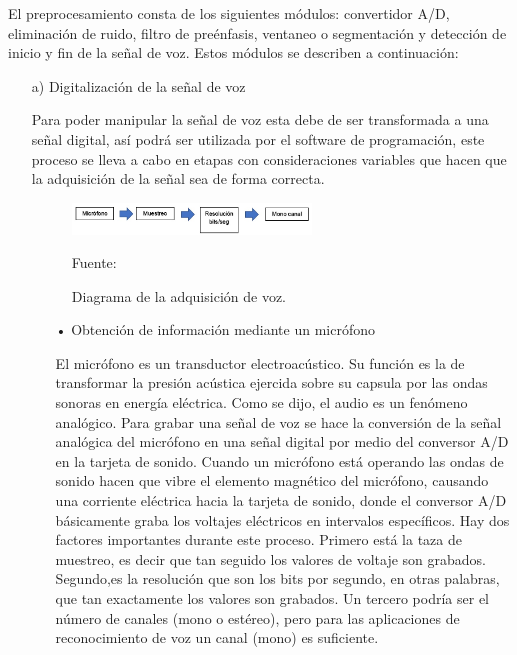 El preprocesamiento consta de los siguientes módulos: convertidor A/D, eliminación de ruido, filtro de preénfasis, ventaneo o segmentación y detección de inicio y fin de la señal de voz. Estos módulos se describen a continuación:

\begin{enumerate}
\item[a)]Digitalización de la señal de voz
\par
Para poder manipular la señal de voz esta debe de ser transformada a una señal digital, así podrá ser utilizada por el software de programación, este proceso se lleva a cabo en etapas con consideraciones variables que hacen que la adquisición de la señal sea de forma correcta.

\newpage
\begin{figure}[ht]
\begin{center}
\includegraphics[width=0.6\textwidth]{Imagenes/Cap2/image008}
\end{center}
\begin{center}
\vskip -0.5cm
\caption{\small{Diagrama de la adquisición de voz.}}
\label{fig:figura2.8}
{\small{Fuente: \cite{eyra}}}
\end{center}
\end{figure}

\begin{enumerate}
\item[•]Obtención de información mediante un micrófono
\par
El micrófono es un transductor electroacústico. Su función es la de transformar la presión acústica ejercida sobre su capsula por las ondas sonoras en energía eléctrica.
\vskip 0.5cm
Como se dijo, el audio es un fenómeno analógico. Para grabar una señal de voz se hace la conversión de la señal analógica del micrófono en una señal digital por medio del conversor A/D en la tarjeta de sonido. Cuando un micrófono está operando las ondas de sonido hacen que vibre el elemento magnético del micrófono, causando una corriente eléctrica hacia la tarjeta de sonido, donde el conversor A/D básicamente graba los voltajes eléctricos en intervalos específicos.
\vskip 0.5cm
Hay dos factores importantes durante este proceso. Primero está la taza de muestreo, es decir que tan seguido los valores de voltaje son grabados. Segundo,es la resolución que son los bits por segundo, en otras palabras, que tan exactamente los valores son grabados. Un tercero podría ser el número de canales (mono o estéreo), pero para las aplicaciones de reconocimiento de voz un canal (mono) es suficiente.


\end{enumerate}
\end{enumerate}
